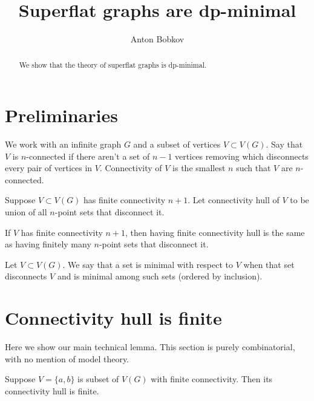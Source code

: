 \documentclass{amsart}
\begin{document}
\title{Superflat graphs are dp-minimal}
\author{Anton Bobkov}

\begin{abstract}
	We show that the theory of superflat graphs is dp-minimal.
\end{abstract}

\maketitle

\section{Preliminaries}

We work with an infinite graph $G$ and a subset of vertices $V \subset V(G)$. Say that $V$ is $n$-connected if there aren't a set of $n-1$ vertices removing which disconnects every pair of vertices in $V$. Connectivity of $V$ is the smallest $n$ such that $V$ are $n$-connected.

\begin{Definition}
	Suppose $V \subset V(G)$ has finite connectivity $n+1$. Let connectivity hull of $V$ to be union of all $n$-point sets that disconnect it.
\end{Definition}

\begin{Note}
	If $V$ has finite connectivity $n+1$, then having finite connectivity hull is the same as having finitely many $n$-point sets that disconnect it.
\end{Note}

\begin{Definition}
	Let $V \subset V(G)$. We say that a set is minimal with respect to $V$ when that set disconnects $V$ and is minimal among such sets (ordered by inclusion).
\end{Definition}

\section{Connectivity hull is finite}

Here we show our main technical lemma. This section is purely combinatorial, with no mention of model theory.

\begin{Lemma}
	Suppose $V = \{a,b\}$ is subset of  $V(G)$ with finite connectivity. Then its connectivity hull is finite.
\end{Lemma}
\end{document}
